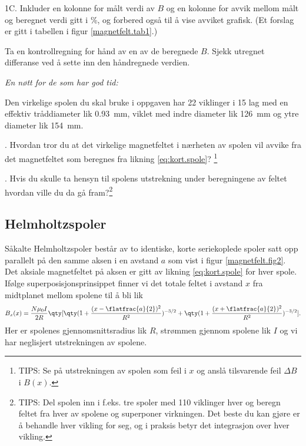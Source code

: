 \documentclass[../Elmag-labhefte-2020.tex]{subfiles}
\begin{document}
{\itsf 1C. Inkluder en kolonne for målt verdi av $B$ og en kolonne for avvik mellom målt og beregnet verdi gitt i \si{\percent}, og forbered også til å vise avviket grafisk.} (Et forslag er gitt i tabellen i figur \ref{magnetfelt.tab1}.)

Ta en kontrollregning for hånd av en av de beregnede $B$. Sjekk utregnet differanse ved å sette inn den håndregnede verdien.

\vspace{4mm}

\emph{En nøtt for de som har god tid:}

Den virkelige spolen du skal bruke i oppgaven har 22 viklinger i 15 lag med en effektiv tråddiameter lik \SI{0,93}{\mm}, viklet med indre diameter lik \SI{126}{\mm} og ytre diameter lik \SI{154}{\mm}. 

{. Hvordan tror du at det virkelige magnetfeltet i nærheten av spolen vil avvike fra det magnetfeltet som beregnes fra likning \eqref{eq:kort.spole}?}
\footnote{TIPS: Se på utstrekningen av spolen som feil i $x$ og anslå tilsvarende feil $\Delta B$ i $B(x)$.}

{. Hvis du skulle ta hensyn til spolens utstrekning under beregningene av feltet hvordan ville du da gå fram?}\footnote{TIPS: Del spolen inn i f.eks. tre spoler med 110 viklinger hver og beregn feltet fra hver av spolene og superponer virkningen. Det beste du kan gjøre er å behandle hver vikling for seg, og i praksis betyr det integrasjon over hver vikling.}

\subsection{Helmholtzspoler}

Såkalte Helmholtzspoler
består av to identiske,  korte seriekoplede spoler satt opp parallelt på den samme aksen i en avstand $a$ som vist i figur \ref{magnetfelt.fig2}. Det aksiale magnetfeltet på aksen er gitt av likning \eqref{eq:kort.spole} for hver spole. Ifølge superposisjonsprinsippet finner vi det totale feltet i avstand $x$ fra midtplanet mellom spolene til å bli lik
%
\begin{equation}
    B_x (x) 
        = \frac{N \mu_0 I}{2 R} \qty[\qty(1 + \frac{(x - \flatfrac{a}{2})^2}{R^2})^{-3/2} 
            + \qty(1 + \frac{(x + \flatfrac{a}{2})^2}{R^2})^{-3/2}].
    \label{eq:Helmholtz}
\end{equation}
%
Her er spolenes gjennomsnittsradius lik $R$, strømmen gjennom spolene lik $I$ og vi har neglisjert utstrekningen av spolene.
\end{document}

